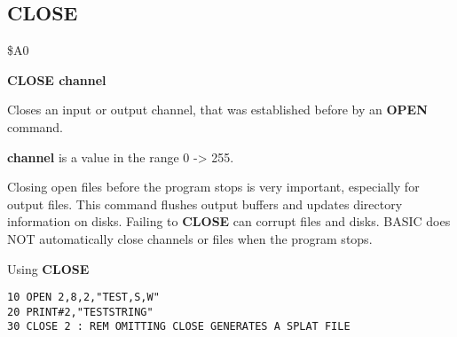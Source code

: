 \subsection{CLOSE}
\begin{description}[leftmargin=2cm,style=nextline]
\item [Token:] \$A0
\item [Format:] {\bf CLOSE channel}
\item [Usage:] Closes an input or output
               channel, that was established before by an {\bf OPEN}
               command.

               {\bf channel} is a value in the range 0 -> 255.

\item [Remarks:] Closing open files before the program stops is
               very important, especially for output files.
               This command flushes output buffers and
               updates directory information on disks.
               Failing to {\bf CLOSE}  can corrupt files and disks.
               BASIC does NOT automatically close channels or files
               when the program stops.

\item [Example:] Using {\bf CLOSE}
\begin{tcolorbox}[colback=black,coltext=white]
\verbatimfont{\codefont}
\begin{verbatim}
10 OPEN 2,8,2,"TEST,S,W"
20 PRINT#2,"TESTSTRING"
30 CLOSE 2 : REM OMITTING CLOSE GENERATES A SPLAT FILE
\end{verbatim}
\end{tcolorbox}
\end{description}


\newpage
